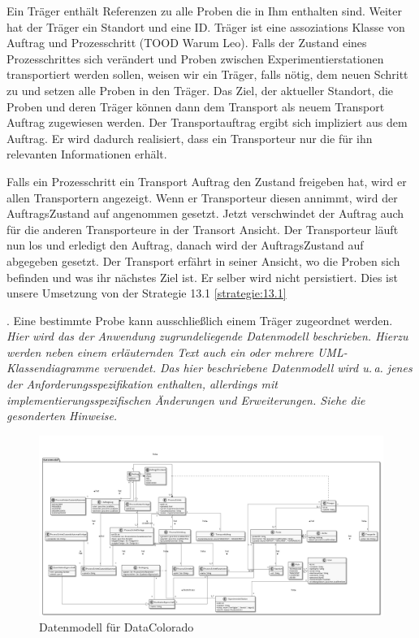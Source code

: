 \documentclass[enabledeprecatedfontcommands,fontsize=12pt,paper=a4,twoside]{scrartcl}
\begin{document}
{Ein Träger enthält Referenzen zu alle Proben die in Ihm enthalten sind. Weiter
hat der Träger ein Standort und eine ID. Träger ist eine assoziations Klasse von
Auftrag und Prozesschritt (TOOD Warum Leo). Falls der Zustand eines
Prozesschrittes sich verändert und Proben zwischen Experimentierstationen
transportiert werden sollen, weisen wir ein Träger, falls nötig, dem neuen
Schritt zu und setzen alle Proben in den Träger. Das Ziel, der aktueller
Standort, die Proben und deren Träger können dann dem Transport als neuem
Transport Auftrag zugewiesen werden. Der Transportauftrag ergibt sich impliziert
aus dem Auftrag. Er wird dadurch realisiert, dass ein Transporteur nur die für
ihn relevanten Informationen erhält.

Falls ein Prozesschritt ein Transport Auftrag den Zustand freigeben hat, wird er
allen Transportern angezeigt. Wenn er Transporteur diesen annimmt, wird der
AuftragsZustand auf angenommen gesetzt. Jetzt verschwindet der Auftrag auch für
die anderen Transporteure in der Transort Ansicht. Der Transporteur läuft nun
los und erledigt den Auftrag, danach wird der AuftragsZustand auf abgegeben
gesetzt. Der Transport erfährt in seiner Ansicht, wo die Proben sich befinden
und was ihr nächstes Ziel ist. Er selber wird nicht persistiert. Dies ist unsere
Umsetzung von der Strategie 13.1 \ref{strategie:13.1} 




  . Eine bestimmte Probe kann ausschließlich einem Träger zugeordnet werden.
{\it Hier wird das der Anwendung zugrundeliegende Datenmodell
  beschrieben. Hierzu werden neben einem erläuternden Text auch ein
  oder mehrere {UML}-Klassendiagramme verwendet. Das hier beschriebene
  Datenmodell wird u.\,a. jenes der Anforderungsspezifikation enthalten,
  allerdings mit implementierungsspezifischen Änderungen und
  Erweiterungen. Siehe die gesonderten Hinweise.}
   
 \begin{figure}
   \includegraphics[width=\textwidth]{UML/datenModel}
  \caption{Datenmodell für DataColorado}
  \centering
 


\end{figure}}
\end{document}
